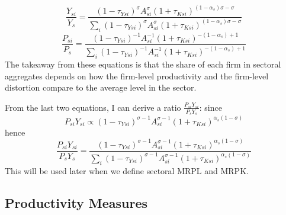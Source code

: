 \documentclass[12pt]{article}
\begin{document}
\begin{itemize}
\begin{equation}
\end{equation}
\begin{equation}
	\frac{Y_{si}}{Y_s} = \frac{(1-\tau_{Ysi})^\sigma A_{si}^{\sigma} (1+\tau_{Ksi})^{(1-\alpha_s) \sigma - \sigma}}{\sum_{i} (1-\tau_{Ysi})^\sigma A_{si}^{\sigma} (1+\tau_{Ksi})^{(1-\alpha_s) \sigma - \sigma}}
\end{equation}
\begin{equation}
	\frac{P_{si}}{P_s} = \frac{(1-\tau_{Ysi})^{-1} A_{si}^{-1} (1+\tau_{Ksi})^{-(1-\alpha_s) + 1}}{\sum_{i} (1-\tau_{Ysi})^{-1} A_{si}^{-1} (1+\tau_{Ksi})^{-(1-\alpha_s) + 1}}
\end{equation}
The takeaway from these equations is that the share of each firm in sectoral aggregates depends on how the firm-level productivity and the firm-level distortion compare to the average level in the sector. 

From the last two equations, I can derive a ratio $\frac{P_{si}Y_{si}}{P_s Y_s}$: since
\[P_{si} Y_{si} \propto (1-\tau_{Ysi})^{\sigma-1} A_{si}^{\sigma-1} (1+\tau_{Ksi})^{\alpha_s (1-\sigma)}\]
hence
\begin{equation} \label{eq:weight}
	\frac{P_{si} Y_{si}}{P_s Y_s} = \frac{(1-\tau_{Ysi})^{\sigma-1} A_{si}^{\sigma-1} (1+\tau_{Ksi})^{\alpha_s (1-\sigma)}}{\sum_i (1-\tau_{Ysi})^{\sigma-1} A_{si}^{\sigma-1} (1+\tau_{Ksi})^{\alpha_s (1-\sigma)}}
\end{equation}
This will be used later when we define sectoral MRPL and MRPK.
\end{itemize}
	
	\subsection{Productivity Measures}
	
\end{document}
